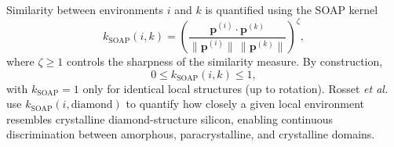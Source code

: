 Similarity between environments $i$ and $k$ is quantified using the SOAP kernel
\begin{equation}
  k_\mathrm{SOAP}(i,k)
  =
  \left(
    \frac{
      \mathbf{p}^{(i)} \cdot \mathbf{p}^{(k)}
    }{
      \|\mathbf{p}^{(i)}\|\,
      \|\mathbf{p}^{(k)}\|
    }
  \right)^{\zeta},
  \label{eq:SOAP_kernel}
\end{equation}
where $\zeta\ge 1$ controls the sharpness of the similarity measure.
By construction,
\[
0 \le k_\mathrm{SOAP}(i,k) \le 1,
\]
with $k_\mathrm{SOAP}=1$ only for identical local structures (up to rotation).
Rosset \emph{et al.} use $k_\mathrm{SOAP}(i,\mathrm{diamond})$ to quantify how
closely a given local environment resembles crystalline diamond-structure
silicon, enabling continuous discrimination between amorphous, paracrystalline,
and crystalline domains.











